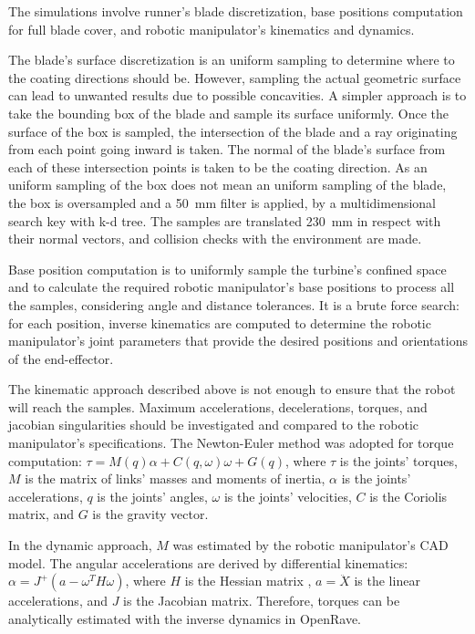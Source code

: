 The simulations involve runner's blade discretization, base
positions computation for full blade cover, and robotic manipulator's kinematics
and dynamics. 

The blade's surface discretization is an uniform sampling to
determine where to the coating directions should be. However, sampling the
actual geometric surface can lead to unwanted results due to possible
concavities. A simpler approach is to take the bounding box of the blade and
sample its surface uniformly. Once the
surface of the box is sampled, the intersection of the blade and a ray
originating from each point going inward is taken. The normal of the blade's
surface from each of these intersection points is taken to be the coating
direction. As an uniform sampling of the box does not mean an uniform sampling
of the blade, the box is oversampled and a 50~mm filter is applied, by a multidimensional search key with k-d tree.
The samples are translated 230~mm in respect with their normal vectors,
and collision checks with the environment are made. 

Base position computation is to uniformly sample the turbine's
confined space and to calculate the required robotic manipulator's base
positions to process all the samples,  considering angle and
distance tolerances. It is a brute force search: for each position, inverse
kinematics are computed to determine the robotic manipulator's joint parameters that provide
the desired positions and orientations of the end-effector.

The kinematic approach described above is not enough to ensure that the robot
will reach the samples. Maximum accelerations, decelerations,
torques, and jacobian singularities should be investigated and compared to the robotic
manipulator's specifications. The Newton-Euler method
\cite{sciavicco2000differential} was adopted for torque computation: $\tau =
M(q)\alpha + C(q,\omega)\omega + G(q)$, where $\tau$ is the joints' torques,
$M$ is the matrix of links' masses and moments of inertia, $\alpha$ is the
joints' accelerations, $q$ is the joints' angles, $\omega$ is the joints'
velocities, $C$ is the Coriolis matrix, and $G$ is the gravity vector.

In the dynamic approach, $M$ was estimated by the robotic manipulator's CAD
model. The angular accelerations are derived by differential kinematics:
$\alpha=J^+(a-\omega^TH\omega)$, where $H$ is the Hessian matrix
\cite{hourtash2005kinematic}, $a=\ddot{X}$ is the linear accelerations, and $J$
is the Jacobian matrix. Therefore, torques can be analytically estimated with
the inverse dynamics in OpenRave. 

